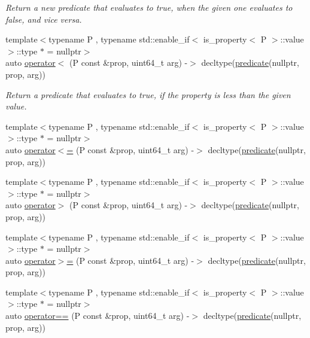 \begin{DoxyCompactItemize}
\begin{DoxyCompactList}\small\item\em Return a new predicate that evaluates to true, when the given one evaluates to false, and vice versa. \end{DoxyCompactList}\item 
{\footnotesize template$<$typename P , typename std\+::enable\+\_\+if$<$ is\+\_\+property$<$ P $>$\+::value $>$\+::type $\ast$  = nullptr$>$ }\\auto \hyperlink{namespacepfq_1_1lang_aa358821bfd1326e552c69635b969835d}{operator$<$} (P const \&prop, uint64\+\_\+t arg) -\/$>$ decltype(\hyperlink{namespacepfq_1_1lang_aca9adafc436b7f851621b979fa1aaf88}{predicate}(nullptr, prop, arg))
\begin{DoxyCompactList}\small\item\em Return a predicate that evaluates to {\ttfamily true}, if the property is less than the given value. \end{DoxyCompactList}\item 
{\footnotesize template$<$typename P , typename std\+::enable\+\_\+if$<$ is\+\_\+property$<$ P $>$\+::value $>$\+::type $\ast$  = nullptr$>$ }\\auto \hyperlink{namespacepfq_1_1lang_a039a937311f139f9a6e84c49c6505c70}{operator$<$=} (P const \&prop, uint64\+\_\+t arg) -\/$>$ decltype(\hyperlink{namespacepfq_1_1lang_aca9adafc436b7f851621b979fa1aaf88}{predicate}(nullptr, prop, arg))
\item 
{\footnotesize template$<$typename P , typename std\+::enable\+\_\+if$<$ is\+\_\+property$<$ P $>$\+::value $>$\+::type $\ast$  = nullptr$>$ }\\auto \hyperlink{namespacepfq_1_1lang_a708ca1f29e8dd2461859c46369e89322}{operator$>$} (P const \&prop, uint64\+\_\+t arg) -\/$>$ decltype(\hyperlink{namespacepfq_1_1lang_aca9adafc436b7f851621b979fa1aaf88}{predicate}(nullptr, prop, arg))
\item 
{\footnotesize template$<$typename P , typename std\+::enable\+\_\+if$<$ is\+\_\+property$<$ P $>$\+::value $>$\+::type $\ast$  = nullptr$>$ }\\auto \hyperlink{namespacepfq_1_1lang_a8278e1cf39622e9eb4859f4720da1d16}{operator$>$=} (P const \&prop, uint64\+\_\+t arg) -\/$>$ decltype(\hyperlink{namespacepfq_1_1lang_aca9adafc436b7f851621b979fa1aaf88}{predicate}(nullptr, prop, arg))
\item 
{\footnotesize template$<$typename P , typename std\+::enable\+\_\+if$<$ is\+\_\+property$<$ P $>$\+::value $>$\+::type $\ast$  = nullptr$>$ }\\auto \hyperlink{namespacepfq_1_1lang_a87c8fa322873efdbddaa437f194b72b0}{operator==} (P const \&prop, uint64\+\_\+t arg) -\/$>$ decltype(\hyperlink{namespacepfq_1_1lang_aca9adafc436b7f851621b979fa1aaf88}{predicate}(nullptr, prop, arg))

\end{DoxyCompactItemize}
